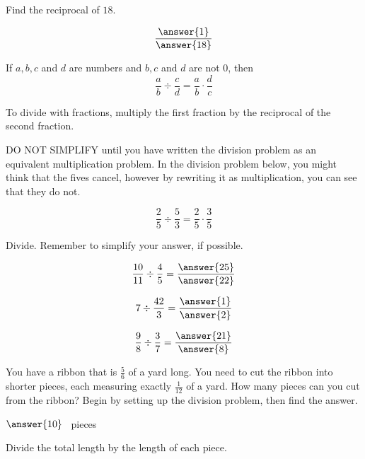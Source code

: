 \documentclass{ximera}[font=12pt]
\begin{document}
\begin{problem}
Find the reciprocal of $18.$

\[ \frac{\answer{1}}{\answer{18}} \] 

\end{problem}


\begin{definition}


If $a, b, c$ and $d$ are numbers and $b, c$ and $d$ are not 0, then
\[ \frac{a}{b} \div \frac{c}{d} = \frac{a}{b} \cdot \frac{d}{c} \]

To divide with fractions, multiply the first fraction by the reciprocal of the second fraction.

\end{definition}

\begin{warning}  
    
DO NOT SIMPLIFY until you have written the division problem as an equivalent multiplication problem.  In the division problem below, 
you might think that the fives cancel, however by rewriting it as multiplication, you can see that they do not.

\[ \frac{2}{5} \div \frac{5}{3}  = \frac{2}{5} \cdot \frac{3}{5} \]

\end{warning}

\begin{problem}
Divide. Remember to simplify your answer, if possible.

\[  \frac{10}{11} \div \frac{4}{5} = \frac{\answer{25}}{\answer{22}} \]

\[ 7 \div \frac{42}{3} = \frac{\answer{1}}{\answer{2}} \]

\[ \frac{9}{8} \div \frac{3}{7} = \frac{\answer{21}}{\answer{8}} \]

\end{problem}

\begin{problem}
You have a ribbon that is $\frac{5}{6}$ of a yard long.  You need to cut the ribbon into shorter pieces, each 
measuring exactly $\frac{1}{12}$ of a yard.  How many pieces can you cut from the ribbon?  Begin by setting up  
the division problem, then find the answer.  

\begin{multipleChoice}
\end{multipleChoice}

$\answer{10}$ \ pieces

\begin{hint}
Divide the total length by the length of each piece.
\end{hint}

\end{problem}
\end{document}
